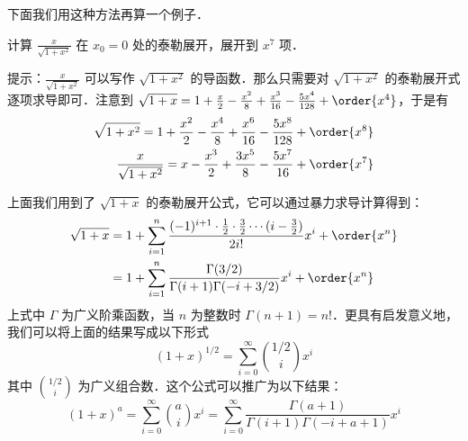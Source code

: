 下面我们用这种方法再算一个例子．
\begin{exercise}{}
计算 $\frac{x}{\sqrt{1+x^2}}$ 在 $x_0=0$ 处的泰勒展开，展开到 $x^7$ 项．
\end{exercise}
提示：$\frac{x}{\sqrt{1+x^2}}$ 可以写作 $\sqrt{1+x^2}$ 的导函数．那么只需要对 $\sqrt{1+x^2}$ 的泰勒展开式逐项求导即可．注意到 $\sqrt{1+x}=1+\frac{x}{2}-\frac{x^2}{8}+\frac{x^3}{16}-\frac{5x^4}{128}+\order{x^4}$，于是有
\begin{equation}
\begin{aligned}
\sqrt{1+x^2}=1+\frac{x^2}{2}-\frac{x^4}{8}+\frac{x^6}{16}-\frac{5x^8}{128}+\order{x^8}\\
\frac{x}{\sqrt{1+x^2}}=x-\frac{x^3}{2}+\frac{3x^5}{8}-\frac{5x^7}{16}+\order{x^7}
\end{aligned}
\end{equation}

上面我们用到了 $\sqrt{1+x}$ 的泰勒展开公式，它可以通过暴力求导计算得到：
\begin{equation}
\begin{aligned}
\sqrt{1+x}&=1+\sum_{i=1}^n\frac{(-1)^{i+1} \cdot \frac{1}{2}\cdot \frac{3}{2}\cdots (i-\frac{3}{2})}{2i!}x^i +\order{x^n}\\
&=1+\sum_{i=1}^n\frac{\Gamma(3/2)}{\Gamma(i+1)\Gamma(-i+3/2)}x^i +\order{x^n}
\end{aligned}
\end{equation}
上式中 $\Gamma$ 为广义阶乘函数，当 $n$ 为整数时 $\Gamma(n+1)=n!$．更具有启发意义地，我们可以将上面的结果写成以下形式
\begin{equation}
(1+x)^{1/2}=\sum_{i=0}^{\infty}{1/2\choose i}x^i
\end{equation}
其中 ${1/2\choose i}$ 为广义组合数．这个公式可以推广为以下结果：
\begin{equation}
(1+x)^{a}=\sum_{i=0}^{\infty}{a\choose i}x^i=\sum_{i=0}^{\infty}\frac{\Gamma(a+1)}{\Gamma(i+1)\Gamma(-i+a+1)}x^i
\end{equation}

